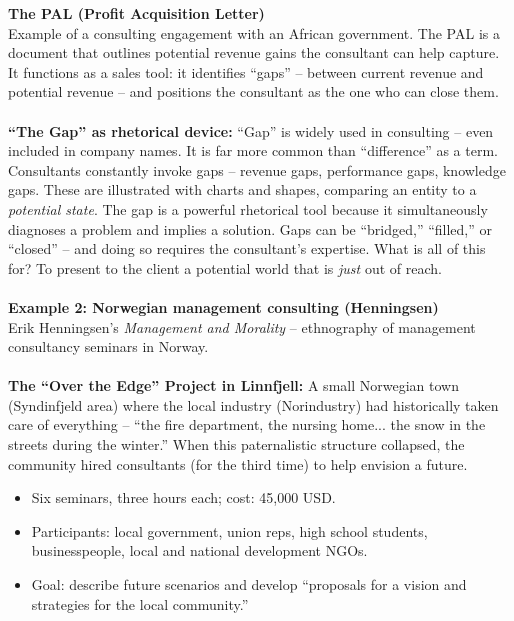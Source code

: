 \documentclass[a4paper,12pt]{article}
\begin{document}
\noindent \textbf{The PAL (Profit Acquisition Letter)} \\
\noindent Example of a consulting engagement with an African government. The PAL is a document that outlines potential revenue gains the consultant can help capture. It functions as a sales tool: it identifies ``gaps'' -- between current revenue and potential revenue -- and positions the consultant as the one who can close them. \\
\\
\noindent \textbf{``The Gap'' as rhetorical device:} ``Gap'' is widely used in consulting -- even included in company names. It is far more common than ``difference'' as a term. Consultants constantly invoke gaps -- revenue gaps, performance gaps, knowledge gaps. These are illustrated with charts and shapes, comparing an entity to a \emph{potential state}. The gap is a powerful rhetorical tool because it simultaneously diagnoses a problem and implies a solution. Gaps can be ``bridged,'' ``filled,'' or ``closed'' -- and doing so requires the consultant's expertise. What is all of this for? To present to the client a potential world that is \emph{just} out of reach. \\
\\
\noindent \textbf{Example 2: Norwegian management consulting (Henningsen)} \\
\noindent Erik Henningsen's \emph{Management and Morality} -- ethnography of management consultancy seminars in Norway. \\
\\
\noindent \textbf{The ``Over the Edge'' Project in Linnfjell:} A small Norwegian town (Syndinfjeld area) where the local industry (Norindustry) had historically taken care of everything -- ``the fire department, the nursing home... the snow in the streets during the winter.'' When this paternalistic structure collapsed, the community hired consultants (for the third time) to help envision a future.
\begin{itemize}
	\item Six seminars, three hours each; cost: 45,000 USD.
	\item Participants: local government, union reps, high school students, businesspeople, local and national development NGOs.
	\item Goal: describe future scenarios and develop ``proposals for a vision and strategies for the local community.''
\end{itemize}
\end{document}
